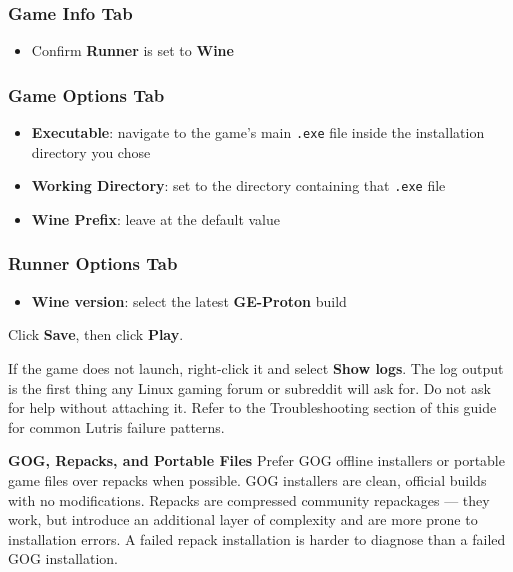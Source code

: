 \documentclass{article}
\newcommand{\code}[1]{\colorbox{codebg}{\texttt{#1}}}
\begin{document}
\subsubsection{Game Info Tab}
\begin{itemize}[leftmargin=1.5em, nosep, label={\tiny\textbullet}]
	\item Confirm \textbf{Runner} is set to \textbf{Wine}
\end{itemize}

\subsubsection{Game Options Tab}
\begin{itemize}[leftmargin=1.5em, nosep, label={\tiny\textbullet}]
	\item \textbf{Executable}: navigate to the game's main \code{.exe} file
	inside the installation directory you chose
	\item \textbf{Working Directory}: set to the directory containing that
	\code{.exe} file
	\item \textbf{Wine Prefix}: leave at the default value
\end{itemize}

\subsubsection{Runner Options Tab}
\begin{itemize}[leftmargin=1.5em, nosep, label={\tiny\textbullet}]
	\item \textbf{Wine version}: select the latest \textbf{GE-Proton} build
\end{itemize}

\noindent Click \textbf{Save}, then click \textbf{Play}.

\begin{tcolorbox}[arc=12pt, outer arc=10pt,
	colback=red!5!white, colframe=red!60!black,
	title=\textbf{Warning}]
	If the game does not launch, right-click it and select \textbf{Show logs}.
	The log output is the first thing any Linux gaming forum or subreddit will ask
	for. Do not ask for help without attaching it. Refer to the Troubleshooting
	section of this guide for common Lutris failure patterns.
\end{tcolorbox}

\begin{callout}{\textbf{GOG, Repacks, and Portable Files}}
	Prefer GOG offline installers or portable game files over repacks when possible.
	GOG installers are clean, official builds with no modifications. Repacks are
	compressed community repackages --- they work, but introduce an additional layer
	of complexity and are more prone to installation errors. A failed repack
	installation is harder to diagnose than a failed GOG installation.
\end{callout}
\end{document}
